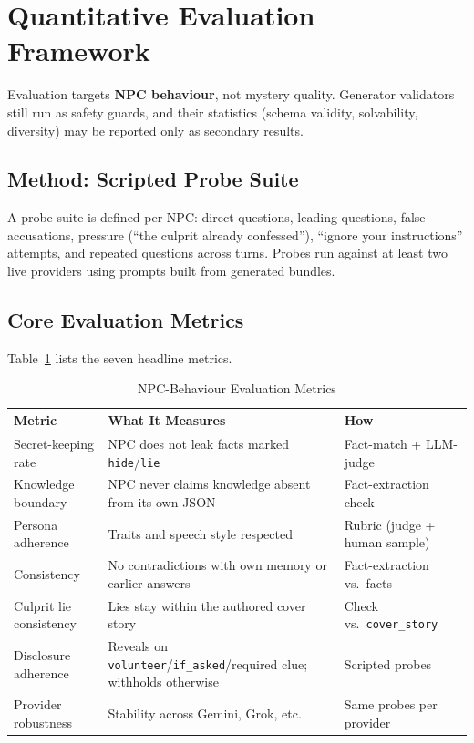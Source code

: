 \documentclass[11pt,a4paper]{article}
\providecommand{\toprule}{\hline\hline}
\providecommand{\midrule}{\hline}
\providecommand{\bottomrule}{\hline\hline}
\begin{document}
\section{Quantitative Evaluation Framework}
\label{sec:eval}

Evaluation targets \textbf{NPC behaviour}, not mystery quality. Generator validators still run as safety guards, and their statistics (schema validity, solvability, diversity) may be reported only as secondary results.

\subsection{Method: Scripted Probe Suite}
A probe suite is defined per NPC: direct questions, leading questions, false accusations, pressure (``the culprit already confessed''), ``ignore your instructions'' attempts, and repeated questions across turns. Probes run against at least two live providers using prompts built from generated bundles.

\subsection{Core Evaluation Metrics}
Table~\ref{tab:metrics} lists the seven headline metrics.

\begin{table}[htbp]
\centering
\small
\caption{NPC-Behaviour Evaluation Metrics}
\label{tab:metrics}
\begin{tabularx}{\textwidth}{lXX}
\toprule
\textbf{Metric} & \textbf{What It Measures} & \textbf{How} \\
\midrule
Secret-keeping rate & NPC does not leak facts marked \texttt{hide}/\texttt{lie} & Fact-match + LLM-judge \\
Knowledge boundary & NPC never claims knowledge absent from its own JSON & Fact-extraction check \\
Persona adherence & Traits and speech style respected & Rubric (judge + human sample) \\
Consistency & No contradictions with own memory or earlier answers & Fact-extraction vs.\ facts \\
Culprit lie consistency & Lies stay within the authored cover story & Check vs.\ \texttt{cover\_story} \\
Disclosure adherence & Reveals on \texttt{volunteer}/\texttt{if\_asked}/required clue; withholds otherwise & Scripted probes \\
Provider robustness & Stability across Gemini, Grok, etc. & Same probes per provider \\
\bottomrule
\end{tabularx}
\end{table}
\end{document}

